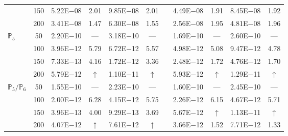 \begin{table}[H]
{\begin{tabular}{@{}l c c c c c c c c c c@{}}
 & 150 & 5.22E$-$08 & 2.01  & 9.85E$-$08 & 2.01 &  & 4.49E$-$08 & 1.91 & 8.45E$-$08 & 1.92\\
 & 200 & 3.41E$-$08 & 1.47  & 6.30E$-$08 & 1.55 &  & 2.56E$-$08 & 1.95 & 4.81E$-$08 & 1.96\\
\midrule
\multirow{4}{*}{$\mathbb{P}_{5}$}
 & 50 & 2.20E$-$10 & ---  & 3.18E$-$10 & --- &  & 1.69E$-$10 & --- & 2.60E$-$10 & ---\\
 & 100 & 3.96E$-$12 & 5.79  & 6.72E$-$12 & 5.57 &  & 4.98E$-$12 & 5.08 & 9.47E$-$12 & 4.78\\
 & 150 & 7.33E$-$13 & 4.16  & 1.72E$-$12 & 3.36 &  & 2.48E$-$12 & 1.72 & 4.76E$-$12 & 1.70\\
 & 200 & 5.79E$-$12 & $\uparrow$  & 1.10E$-$11 & $\uparrow$ &  & 5.93E$-$12 & $\uparrow$ & 1.29E$-$11 & $\uparrow$\\
\midrule
\multirow{4}{*}{$\mathbb{P}_{5}/\mathbb{P}_{6}$}
 & 50 & 1.55E$-$10 & ---  & 2.23E$-$10 & --- &  & 1.60E$-$10 & --- & 2.45E$-$10 & ---\\
 & 100 & 2.00E$-$12 & 6.28  & 4.15E$-$12 & 5.75 &  & 2.26E$-$12 & 6.15 & 4.67E$-$12 & 5.71\\
 & 150 & 3.96E$-$13 & 4.00  & 9.29E$-$13 & 3.69 &  & 5.67E$-$12 & $\uparrow$ & 1.13E$-$11 & $\uparrow$\\
 & 200 & 4.07E$-$12 & $\uparrow$  & 7.61E$-$12 & $\uparrow$ &  & 3.66E$-$12 & 1.52 & 7.71E$-$12 & 1.33\\
\bottomrule
\end{tabular}}
\label{none}
\end{table}
